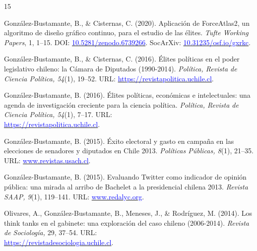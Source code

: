 \begin{publications}
\begin{benumerate}{15}
\item{González-Bustamante, B., \& Cisternas, C. (2020). Aplicación de ForceAtlas2, un algoritmo de diseño gráfico continuo, para el estudio de las élites. {\itshape Tufte Working Papers}, 1, 1--15. DOI: \href{https://doi.org/10.5281/zenodo.6739266}{\textcolor{blue}{10.5281/zenodo.6739266}}. SocArXiv: \href{https://doi.org/10.31235/osf.io/gxrkc}{\textcolor{blue}{10.31235/osf.io/gxrkc}}.}\vspace{1mm}

\item{González-Bustamante, B., \& Cisternas, C. (2016). Élites políticas en el poder legislativo chileno: la Cámara de Diputados (1990-2014). {\itshape Política, Revista de Ciencia Política, 54}(1), 19--52. URL: \href{https://revistapolitica.uchile.cl/index.php/RP/article/view/42691}{\textcolor{blue}{https://revistapolitica.uchile.cl}}.}\vspace{1mm}

\item{González-Bustamante, B. (2016). Élites políticas, económicas e intelectuales: una agenda de investigación creciente para la ciencia política. {\itshape Política, Revista de Ciencia Política, 54}(1), 7--17. URL: \\ \href{https://revistapolitica.uchile.cl/index.php/RP/article/view/42690}{\textcolor{blue}{https://revistapolitica.uchile.cl}}.}\vspace{1mm}

\item{González-Bustamante, B. (2015). Éxito electoral y gasto en campaña en las elecciones de senadores y diputados en Chile 2013. {\itshape Políticas Públicas, 8}(1), 21--35. URL: \href{http://www.revistas.usach.cl/ojs/index.php/politicas/article/view/2182}{\textcolor{blue}{www.revistas.usach.cl}}.} \vspace{1mm}

\item{González-Bustamante, B. (2015). Evaluando Twitter como indicador de opinión pública: una mirada al arribo de Bachelet a la presidencial chilena 2013. {\itshape Revista SAAP, 9}(1), 119--141. URL: \href{https://www.redalyc.org/articulo.oa?id=387142733006}{\textcolor{blue}{www.redalyc.org}}.} \vspace{1mm}

\item{Olivares, A., González-Bustamante, B., Meneses, J., \& Rodríguez, M. (2014). Los think tanks en el gabinete: una exploración del caso chileno (2006-2014). {\itshape Revista de Sociología,} 29, 37--54. URL: \\ \href{https://revistadesociologia.uchile.cl/index.php/RDS/article/view/36177}{\textcolor{blue}{https://revistadesociologia.uchile.cl}}.} \vspace{1mm} %


\end{benumerate}
\end{publications}
